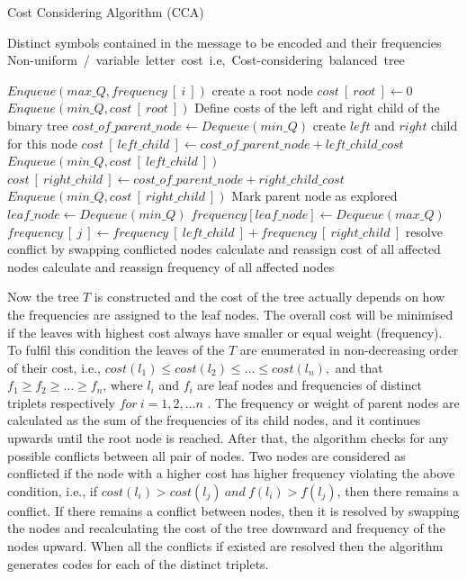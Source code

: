 \documentclass[preprint,12pt]{elsarticle}%
\begin{document}
\begin{algorithm}[!btph]
\caption{Cost Considering Algorithm (CCA)}
\label{alg1}

\begin{algorithmic}[1]
\REQUIRE Distinct symbols contained in the message to be encoded and their frequencies 
\ENSURE Non-uniform\ /\ variable\ letter\ cost\ i.e,\ Cost-considering\ balanced\ tree

\STATE $ Enqueue\left(max\_Q , frequency~[~i~]\right)$
\ENDFOR
\STATE create a root node
\STATE $cost~[~root~]\leftarrow 0$
\STATE $Enqueue\left(min\_Q , cost~[~root~]\right)$
\STATE Define costs of the left and right child of the binary tree
\REPEAT 
\STATE $cost\_of\_parent\_node\leftarrow Dequeue\left(min\_Q\right)$
\STATE create $left$ and $right$ child for this node
\STATE $cost~[~left\_child~]\leftarrow cost\_of\_parent\_node+left\_child\_cost$
\STATE $Enqueue\left(min\_Q , cost~[~left\_child~]\right)$
\STATE $cost~[~right\_child~]\leftarrow cost\_of\_parent\_node+right\_child\_cost$
\STATE $Enqueue\left(min\_Q , cost~[~right\_child~]\right)$
\STATE Mark parent node as explored
\STATE $leaf\_node\leftarrow Dequeue\left(min\_Q\right)$
\STATE $frequency[leaf\_node]\leftarrow Dequeue\left(max\_Q\right)$
\ENDWHILE
{} 
\STATE $frequency~[~j~]\leftarrow frequency~[~left\_child~]+frequency~[~right\_child~]$
\ENDFOR
\REPEAT
{} 
\STATE resolve conflict by swapping conflicted nodes
\STATE calculate and reassign cost of all affected nodes
\STATE calculate and reassign frequency of all affected nodes 
\ENDIF
{}
\end{algorithmic}
\end{algorithm}

Now the tree $T$ is constructed and the cost of the tree actually depends on how the frequencies are assigned to the leaf nodes. The overall cost will be minimised if the leaves with highest cost always have smaller or equal weight (frequency). To fulfil this condition the leaves of the $T$ are enumerated in non-decreasing order of their cost, i.e., $cost(l_1)\leq cost(l_2)\leq \ldots \leq cost(l_n),$ and that $f_1 \geq f_2 \geq \ldots\geq f_n$, where $l_i$ and $f_i$ are leaf nodes and frequencies of distinct triplets respectively $for~ i=1,2,\ldots n$ . The frequency or weight of parent nodes are calculated as the sum of the frequencies of its child nodes, and it continues upwards until the root node is reached. After that, the algorithm checks for any possible conflicts between all pair of nodes. Two nodes are considered as conflicted if the node with a higher cost has higher frequency violating the above condition, i.e., if $cost(l_i)> cost(l_j)~and~f(l_i)>f(l_j)$, then there remains a conflict.  If there remains a conflict between nodes, then it is resolved by swapping the nodes and recalculating the cost of the tree downward and frequency of the nodes upward.  When all the conflicts if existed are resolved then the algorithm generates codes for each of the distinct triplets.   
\end{document}
